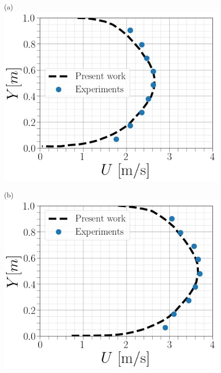 \documentclass[review,3p,times,12pt]{elsarticle}
\begin{document}
\begin{minipage}[t]{0.5\textwidth}
\begin{figure}[H]
\begin{center}
(a)\includegraphics[scale = 0.3]{V22}
 \end{center}
\end{figure}
\end{minipage} \hfill 
\begin{minipage}[t]{0.5\textwidth}
\begin{figure}[H]
\begin{center}
(b)\includegraphics[scale = 0.3]{3CFD}
 \end{center}
\end{figure}
\end{minipage}\\
\end{document}
